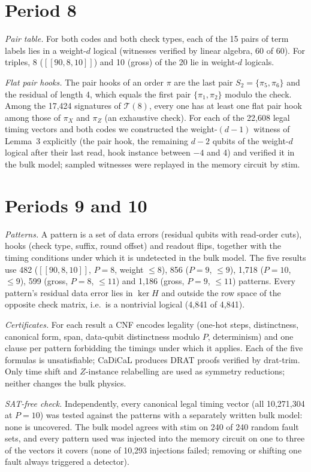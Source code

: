 \documentclass[aps,prl,twocolumn,superscriptaddress,nofootinbib]{revtex4-2}
\newcommand{\code}[1]{[[#1]]}
\newcommand{\T}{\mathcal{T}}
\begin{document}
\section{Period 8}\label{sm:p8}
\emph{Pair table.} For both codes and both check types, each of the 15 pairs of term labels
lies in a weight-$d$ logical (witnesses verified by linear algebra, 60 of 60). For triples,
8 ($\code{90,8,10}$) and 10 (gross) of the 20 lie in weight-$d$ logicals.

\emph{Flat pair hooks.} The pair hooks of an order $\pi$ are the last pair
$S_2=\{\pi_5,\pi_6\}$ and the residual of length 4, which equals the first pair
$\{\pi_1,\pi_2\}$ modulo the check. Among the 17,424 signatures of $\T(8)$, every one has at
least one flat pair hook among those of $\pi_X$ and $\pi_Z$ (an exhaustive check). For each
of the 22,608 legal timing vectors and both codes we constructed the weight-$(d-1)$ witness
of Lemma~3 explicitly (the pair hook, the remaining $d-2$ qubits of the weight-$d$ logical
after their last read, hook instance between $-4$ and 4) and verified it in the bulk model;
sampled witnesses were replayed in the memory circuit by stim.

\section{Periods 9 and 10}\label{sm:p910}
\emph{Patterns.} A pattern is a set of data errors (residual qubits with read-order cuts),
hooks (check type, suffix, round offset) and readout flips, together with the timing
conditions under which it is undetected in the bulk model. The five results use 482
($\code{90,8,10}$, $P=8$, weight $\le8$), 856 ($P=9$, $\le9$), 1,718 ($P=10$, $\le9$), 599
(gross, $P=8$, $\le11$) and 1,186 (gross, $P=9$, $\le11$) patterns. Every pattern's residual
data error lies in $\ker H$ and outside the row space of the opposite check matrix, i.e.\ is
a nontrivial logical (4,841 of 4,841).

\emph{Certificates.} For each result a CNF encodes legality (one-hot steps, distinctness,
canonical form, span, data-qubit distinctness modulo $P$, determinism) and one clause per
pattern forbidding the timings under which it applies. Each of the five formulas is
unsatisfiable; CaDiCaL produces DRAT proofs verified by drat-trim. Only time shift and
$Z$-instance relabelling are used as symmetry reductions; neither changes the bulk physics.

\emph{SAT-free check.} Independently, every canonical legal timing vector (all 10,271,304
at $P=10$) was tested against the patterns with a separately written bulk model: none is
uncovered. The bulk model agrees with stim on 240 of 240 random fault sets, and every pattern
used was injected into the memory circuit on one to three of the vectors it covers (none of 10,293 injections
failed; removing or shifting one fault always triggered a detector).
\end{document}

